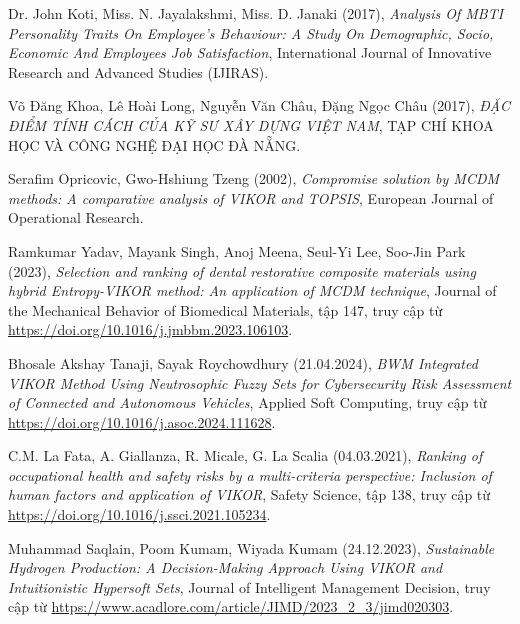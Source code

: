 \begin{thebibliography}{99}
    Dr. John Koti, Miss. N. Jayalakshmi, Miss. D. Janaki (2017),
    \emph{Analysis Of MBTI Personality Traits On Employee’s Behaviour: A Study On Demographic, Socio, Economic And Employees Job Satisfaction},
    International Journal of Innovative Research and Advanced Studies (IJIRAS).

    Võ Đăng Khoa, Lê Hoài Long, Nguyễn Văn Châu, Đặng Ngọc Châu (2017),
    \emph{ĐẶC ĐIỂM TÍNH CÁCH CỦA KỸ SƯ XÂY DỰNG VIỆT NAM},
    TẠP CHÍ KHOA HỌC VÀ CÔNG NGHỆ ĐẠI HỌC ĐÀ NẴNG.

    Serafim Opricovic, Gwo-Hshiung Tzeng (2002),
    \emph{Compromise solution by MCDM methods: A comparative analysis of VIKOR and TOPSIS},
    European Journal of Operational Research.

    Ramkumar Yadav, Mayank Singh, Anoj Meena, Seul-Yi Lee, Soo-Jin Park (2023),
    \emph{Selection and ranking of dental restorative composite materials using hybrid Entropy-VIKOR method: An application of MCDM technique},
    Journal of the Mechanical Behavior of Biomedical Materials,
    tập 147,
    truy cập từ \href{https://doi.org/10.1016/j.jmbbm.2023.106103}{\color{black}https://doi.org/10.1016/j.jmbbm.2023.106103}.

    Bhosale Akshay Tanaji, Sayak Roychowdhury (21.04.2024),
    \emph{BWM Integrated VIKOR Method Using Neutrosophic Fuzzy Sets for Cybersecurity Risk Assessment of Connected and Autonomous Vehicles},
    Applied Soft Computing,
    truy cập từ \href{https://doi.org/10.1016/j.asoc.2024.111628}{\color{black}https://doi.org/10.1016/j.asoc.2024.111628}.
    
    C.M. La Fata, A. Giallanza, R. Micale, G. La Scalia (04.03.2021),
    \emph{Ranking of occupational health and safety risks by a multi-criteria perspective: Inclusion of human factors and application of VIKOR},
    Safety Science,
    tập 138,
    truy cập từ \href{https://doi.org/10.1016/j.ssci.2021.105234}{\color{black}https://doi.org/10.1016/j.ssci.2021.105234}.

    Muhammad Saqlain, Poom Kumam, Wiyada Kumam (24.12.2023), 
    \emph{Sustainable Hydrogen Production: A Decision-Making Approach Using VIKOR and Intuitionistic Hypersoft Sets},
    Journal of Intelligent Management Decision,
    truy cập từ \href{https://www.acadlore.com/article/JIMD/2023_2_3/jimd020303}{\color{black}\url{https://www.acadlore.com/article/JIMD/2023_2_3/jimd020303}}.


\end{thebibliography}
